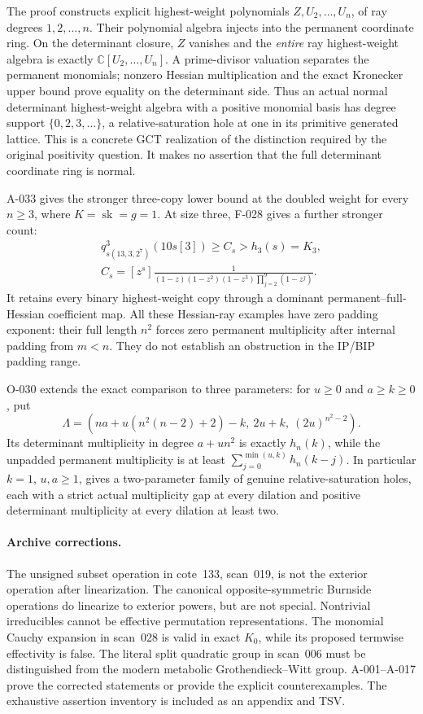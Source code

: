 The proof constructs explicit highest-weight polynomials
\(Z,U_2,\ldots,U_n\), of ray degrees \(1,2,\ldots,n\).
Their polynomial algebra injects into the permanent coordinate ring.
On the determinant closure, \(Z\) vanishes and the \emph{entire}
ray highest-weight algebra is exactly \(\mathbb C[U_2,\ldots,U_n]\).
A prime-divisor valuation separates the permanent monomials;
nonzero Hessian multiplication and the exact Kronecker upper bound
prove equality on the determinant side.
Thus an actual normal determinant highest-weight algebra with a
positive monomial basis has degree support
\(\{0,2,3,\ldots\}\), a relative-saturation hole at one in its
primitive generated lattice. This is a concrete GCT realization
of the distinction required by the original positivity question.
It makes no assertion that the full determinant coordinate ring is normal.

A-033 gives the stronger three-copy lower bound at the doubled
weight for every \(n\geq3\), where \(K=\operatorname{sk}=g=1\).
At size three, F-028 gives a further stronger count:
\[
 \begin{gathered}
 q^3_{s(13,3,2^7)}(10s[3])\geq C_s>h_3(s)=K_3,\\
 C_s=[z^s]\frac{1}
 {(1-z)(1-z^2)(1-z^3)\prod_{j=2}^{9}(1-z^j)}.
 \end{gathered}
\]
It retains every binary highest-weight copy through a dominant
permanent--full-Hessian coefficient map. All these Hessian-ray
examples have zero padding exponent: their full length \(n^2\)
forces zero permanent multiplicity after internal padding from \(m<n\).
They do not establish an obstruction in the IP/BIP padding range.

O-030 extends the exact comparison to three parameters:
for \(u\geq0\) and \(a\geq k\geq0\), put
\[
 \Lambda=(na+u(n^2(n-2)+2)-k,\ 2u+k,\ (2u)^{n^2-2}).
\]
Its determinant multiplicity in degree \(a+un^2\) is exactly
\(h_n(k)\), while the unpadded permanent multiplicity is at least
\(\sum_{j=0}^{\min(u,k)}h_n(k-j)\).
In particular \(k=1\), \(u,a\geq1\), gives a two-parameter
family of genuine relative-saturation holes, each with a strict
actual multiplicity gap at every dilation and positive determinant
multiplicity at every dilation at least two.

\paragraph{Archive corrections.}
The unsigned subset operation in cote~133, scan~019, is not the
exterior operation after linearization. The canonical opposite-symmetric
Burnside operations do linearize to exterior powers, but are not
special. Nontrivial irreducibles cannot be effective permutation
representations. The monomial Cauchy expansion in scan~028 is valid
in exact \(K_0\), while its proposed termwise effectivity is false.
The literal split quadratic group in scan~006 must be distinguished
from the modern metabolic Grothendieck--Witt group. A-001--A-017
prove the corrected statements or provide the explicit counterexamples.
The exhaustive assertion inventory is included as an appendix and TSV.

